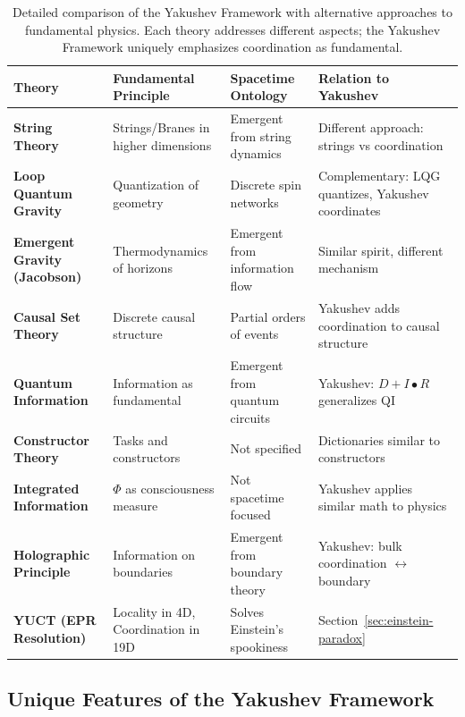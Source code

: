 \documentclass[11pt,a4paper]{article}
\begin{document}
	\begin{table}[htbp]
		\centering
		\scriptsize
		\begin{tabular}{p{}p{}p{}p{}}
			\toprule
			\textbf{Theory} & \textbf{Fundamental Principle} & \textbf{Spacetime Ontology} & \textbf{Relation to Yakushev} \\
			\midrule
			\textbf{String Theory} & 
			Strings/Branes in higher dimensions & 
			Emergent from string dynamics & 
			Different approach: strings vs coordination \\
			\hline
			\textbf{Loop Quantum Gravity} & 
			Quantization of geometry & 
			Discrete spin networks & 
			Complementary: LQG quantizes, Yakushev coordinates \\
			\hline
			\textbf{Emergent Gravity (Jacobson)} & 
			Thermodynamics of horizons & 
			Emergent from information flow & 
			Similar spirit, different mechanism \\
			\hline
			\textbf{Causal Set Theory} & 
			Discrete causal structure & 
			Partial orders of events & 
			Yakushev adds coordination to causal structure \\
			\hline
			\textbf{Quantum Information} & 
			Information as fundamental & 
			Emergent from quantum circuits & 
			Yakushev: $D+I•R$ generalizes QI \\
			\hline
			\textbf{Constructor Theory} & 
			Tasks and constructors & 
			Not specified & 
			Dictionaries similar to constructors \\
			\hline
			\textbf{Integrated Information} & 
			$\Phi$ as consciousness measure & 
			Not spacetime focused & 
			Yakushev applies similar math to physics \\
			\hline
			\textbf{Holographic Principle} & 
			Information on boundaries & 
			Emergent from boundary theory & 
			Yakushev: bulk coordination $\leftrightarrow$ boundary \\
			\hline
			\textbf{YUCT (EPR Resolution)} & 
			Locality in 4D, Coordination in 19D & 
			Solves Einstein's spookiness & 
			Section~\ref{sec:einstein-paradox} \\
			\bottomrule
		\end{tabular}
		\caption{Detailed comparison of the Yakushev Framework with alternative approaches to fundamental physics. Each theory addresses different aspects; the Yakushev Framework uniquely emphasizes coordination as fundamental.}
	\end{table}
	
	\subsection{Unique Features of the Yakushev Framework}
	
\end{document}
